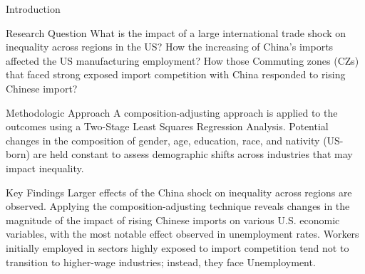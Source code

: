 \begin{frame}{Introduction}

    \begin{block}{Research Question}
        What is the impact of a large international trade shock on inequality across regions in the US?
        How the increasing of China’s imports affected the US manufacturing employment?
        How those Commuting zones (CZs) that faced strong exposed import competition with China responded to rising Chinese import?
    \end{block}

    \begin{block}{Methodologic Approach}
        A composition-adjusting approach is applied to the outcomes using a Two-Stage Least Squares Regression Analysis. Potential changes in the composition of gender, age, education, race, and nativity (US-born) are held constant to assess demographic shifts across industries that may impact inequality.
    \end{block}

    \begin{block}{Key Findings}
        Larger effects of the China shock on inequality across regions are observed.
        Applying the composition-adjusting technique reveals changes in the magnitude of the impact of rising Chinese imports on various U.S. economic variables, with the most notable effect observed in unemployment rates. Workers initially employed in sectors highly exposed to import competition tend not to transition to higher-wage industries; instead, they face Unemployment.
    \end{block}
\end{frame}